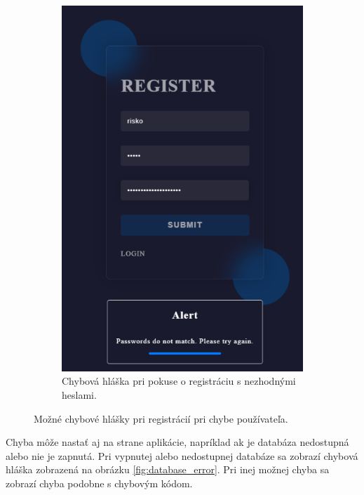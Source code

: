 \begin{figure}[H]
\begin{subfigure}{.45\textwidth}
    \includegraphics[width=.9\textwidth]{img/auth/passwords_dont_match.png}
    \caption{Chybová hláška pri pokuse o registráciu s nezhodnými heslami.}
    \label{fig:passwords_dont_match}
  \end{subfigure}
  \caption{Možné chybové hlášky pri registrácií pri chybe používateľa.}
\end{figure}

Chyba môže nastať aj na strane aplikácie, napríklad ak je databáza nedostupná alebo nie je zapnutá. Pri vypnutej alebo nedostupnej databáze sa zobrazí chybová hláška zobrazená na obrázku \ref{fig:database_error}. Pri inej možnej chyba sa zobrazí chyba podobne s chybovým kódom.

